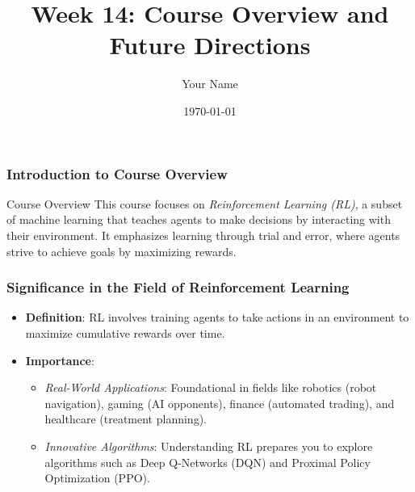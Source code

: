 \documentclass{beamer}
\title{Week 14: Course Overview and Future Directions}
\author{Your Name}
\institute{Your Institution}
\date{\today}
\begin{document}
\frame{\titlepage}

\begin{frame}[fragile]
    \frametitle{Introduction to Course Overview}
    \begin{block}{Course Overview}
        This course focuses on \textit{Reinforcement Learning (RL)}, a subset of machine learning that teaches agents to make decisions by interacting with their environment.
        It emphasizes learning through trial and error, where agents strive to achieve goals by maximizing rewards.
    \end{block}
\end{frame}

\begin{frame}[fragile]
    \frametitle{Significance in the Field of Reinforcement Learning}
    \begin{itemize}
        \item \textbf{Definition}: RL involves training agents to take actions in an environment to maximize cumulative rewards over time.
        
        \item \textbf{Importance}:
        \begin{itemize}
            \item \textit{Real-World Applications}: Foundational in fields like robotics (robot navigation), gaming (AI opponents), finance (automated trading), and healthcare (treatment planning).
            \item \textit{Innovative Algorithms}: Understanding RL prepares you to explore algorithms such as Deep Q-Networks (DQN) and Proximal Policy Optimization (PPO).
        \end{itemize}
    \end{itemize}
\end{frame}
\end{document}
